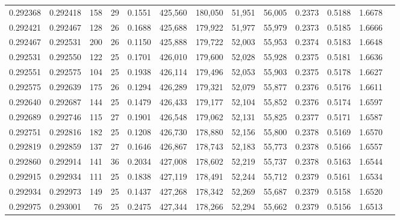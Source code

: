 \begin{tabular}{rrrrrrrrrrrrr}
0.292368 & 0.292418 &   158 &  29 &                                     0.1551 & 425,560 & 180,050 &  51,951 &  56,005 & 0.2373 & 0.5188 & 1.6678 \\
0.292421 & 0.292467 &   128 &  26 &                                     0.1688 & 425,688 & 179,922 &  51,977 &  55,979 & 0.2373 & 0.5185 & 1.6666 \\
0.292467 & 0.292531 &   200 &  26 &                                     0.1150 & 425,888 & 179,722 &  52,003 &  55,953 & 0.2374 & 0.5183 & 1.6648 \\
0.292531 & 0.292550 &   122 &  25 &                                     0.1701 & 426,010 & 179,600 &  52,028 &  55,928 & 0.2375 & 0.5181 & 1.6636 \\
0.292551 & 0.292575 &   104 &  25 &                                     0.1938 & 426,114 & 179,496 &  52,053 &  55,903 & 0.2375 & 0.5178 & 1.6627 \\
0.292575 & 0.292639 &   175 &  26 &                                     0.1294 & 426,289 & 179,321 &  52,079 &  55,877 & 0.2376 & 0.5176 & 1.6611 \\
0.292640 & 0.292687 &   144 &  25 &                                     0.1479 & 426,433 & 179,177 &  52,104 &  55,852 & 0.2376 & 0.5174 & 1.6597 \\
0.292689 & 0.292746 &   115 &  27 &                                     0.1901 & 426,548 & 179,062 &  52,131 &  55,825 & 0.2377 & 0.5171 & 1.6587 \\
0.292751 & 0.292816 &   182 &  25 &                                     0.1208 & 426,730 & 178,880 &  52,156 &  55,800 & 0.2378 & 0.5169 & 1.6570 \\
0.292819 & 0.292859 &   137 &  27 &                                     0.1646 & 426,867 & 178,743 &  52,183 &  55,773 & 0.2378 & 0.5166 & 1.6557 \\
0.292860 & 0.292914 &   141 &  36 &                                     0.2034 & 427,008 & 178,602 &  52,219 &  55,737 & 0.2378 & 0.5163 & 1.6544 \\
0.292915 & 0.292934 &   111 &  25 &                                     0.1838 & 427,119 & 178,491 &  52,244 &  55,712 & 0.2379 & 0.5161 & 1.6534 \\
0.292934 & 0.292973 &   149 &  25 &                                     0.1437 & 427,268 & 178,342 &  52,269 &  55,687 & 0.2379 & 0.5158 & 1.6520 \\
0.292975 & 0.293001 &    76 &  25 &                                     0.2475 & 427,344 & 178,266 &  52,294 &  55,662 & 0.2379 & 0.5156 & 1.6513 \\

\end{tabular}
